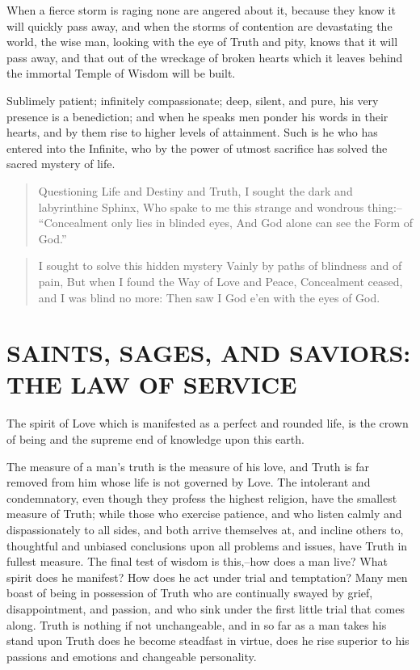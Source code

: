 \documentclass[12pt,oneside]{scrbook}
\begin{document}
  When a fierce storm is raging none are angered about it, because they
  know it will quickly pass away, and when the storms of contention are
  devastating the world, the wise man, looking with the eye of Truth and
  pity, knows that it will pass away, and that out of the wreckage of
  broken hearts which it leaves behind the immortal Temple of Wisdom will
  be built.
  
  Sublimely patient; infinitely compassionate; deep, silent, and pure, his
  very presence is a benediction; and when he speaks men ponder his words
  in their hearts, and by them rise to higher levels of attainment. Such
  is he who has entered into the Infinite, who by the power of utmost
  sacrifice has solved the sacred mystery of life.
  
  \begin{quote}
  Questioning Life and Destiny and Truth, I sought the dark and
  labyrinthine Sphinx, Who spake to me this strange and wondrous thing:--
  ``Concealment only lies in blinded eyes, And God alone can see the Form
  of God.''
  \end{quote}
  
  \begin{quote}
  I sought to solve this hidden mystery Vainly by paths of blindness and
  of pain, But when I found the Way of Love and Peace, Concealment ceased,
  and I was blind no more: Then saw I God e'en with the eyes of God.
  \end{quote}
  
  \section{SAINTS, SAGES, AND SAVIORS: THE LAW OF
  SERVICE}\label{saints-sages-and-saviors-the-law-of-service}
  
  The spirit of Love which is manifested as a perfect and rounded life, is
  the crown of being and the supreme end of knowledge upon this earth.
  
  The measure of a man's truth is the measure of his love, and Truth is
  far removed from him whose life is not governed by Love. The intolerant
  and condemnatory, even though they profess the highest religion, have
  the smallest measure of Truth; while those who exercise patience, and
  who listen calmly and dispassionately to all sides, and both arrive
  themselves at, and incline others to, thoughtful and unbiased
  conclusions upon all problems and issues, have Truth in fullest measure.
  The final test of wisdom is this,--how does a man live? What spirit does
  he manifest? How does he act under trial and temptation? Many men boast
  of being in possession of Truth who are continually swayed by grief,
  disappointment, and passion, and who sink under the first little trial
  that comes along. Truth is nothing if not unchangeable, and in so far as
  a man takes his stand upon Truth does he become steadfast in virtue,
  does he rise superior to his passions and emotions and changeable
  personality.
  
\end{document}
